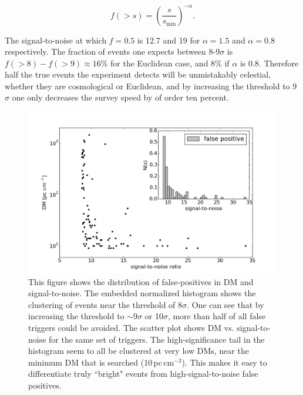 \begin{equation}
f(>s) = \left(\frac{s}{s_\mathrm{min}}\right)^{-\alpha}.
\end{equation}

\noindent The signal-to-noise at which $f=0.5$ is 
12.7 and 19 for $\alpha=1.5$ and $\alpha=0.8$ respectively. 
The fraction of events one expects between 8-9$\sigma$ is 
$f(>8) - f(>9) \approx 16\%$ for the Euclidean case, 
and $8\%$ if $\alpha$ is 0.8. Therefore half the true events 
the experiment detects will be unmistakably celestial, whether they 
are cosmological or Euclidean, and by increasing the threshold 
to 9$\sigma$ one only decreases the survey speed by of order 
ten percent. 

\begin{figure}[!h]
\begin{center}
\includegraphics[trim={0in 0in 0in 0in}, scale=0.5]
{./figures/beamforming/dm_dist_falsepositives.png}
\vspace{0.0cm}
\caption[abc]{This figure shows the distribution 
     of false-positives in DM and signal-to-noise. The 
     embedded normalized histogram shows the clustering of events 
     near the threshold of 8$\sigma$. One can see that by 
     increasing the threshold to $\sim$9$\sigma$ or 10$\sigma$, 
     more than half of all 
     false triggers could be avoided. The scatter plot shows 
     DM vs. signal-to-noise for the same set of triggers. The 
     high-significance tail in the histogram seem to all be clustered 
     at very low DMs, near the minimum DM that is searched 
     (10\,pc\,cm$^{-3}$). This makes it easy to differentiate truly 
     ``bright" events from high-signal-to-noise false positives.}
\end{center}
\label{fig-scatterhist}
\end{figure}

